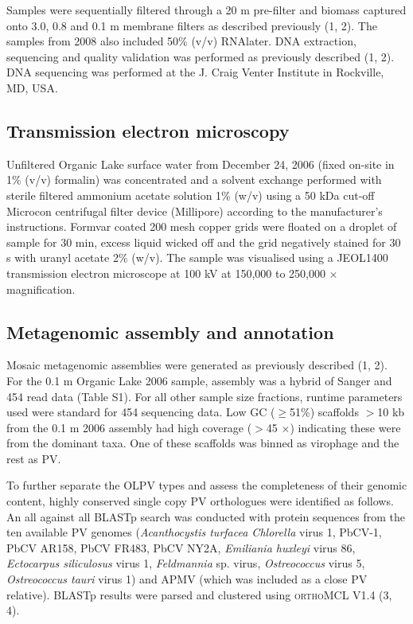 Samples were sequentially filtered through a 20 \textmu{}m pre-filter and biomass captured onto 3.0, 0.8 and 0.1 \textmu{}m membrane filters as described previously (1, 2). 
The samples from 2008 also included 50\% (v/v) \textsc{RNA}later. 
DNA extraction, sequencing and quality validation was performed as previously described (1, 2). 
DNA sequencing was performed at the J. Craig Venter Institute in Rockville, \textsc{MD}, \textsc{USA}.  

\subsection{Transmission electron microscopy}
Unfiltered Organic Lake surface water from December 24, 2006 (fixed on-site in 1\% (v/v) formalin) was concentrated and a solvent exchange performed with sterile filtered ammonium acetate solution 1\% (w/v) using a 50 kDa cut-off Microcon centrifugal filter device (Millipore) according to the manufacturer’s instructions. 
Formvar coated 200 mesh copper grids were floated on a droplet of sample for 30 min, excess liquid wicked off and the grid negatively stained for 30 s with uranyl acetate 2\% (w/v). 
The sample was visualised using a \textsc{JEOL1400} transmission electron microscope at 100 kV at 150,000 to 250,000 $\times$ magnification.

\subsection{Metagenomic assembly and annotation}
Mosaic metagenomic assemblies were generated as previously described (1, 2). 
For the 0.1 \textmu{}m Organic Lake 2006 sample, assembly was a hybrid of Sanger and 454 read data (Table S1). 
For all other sample size fractions, runtime parameters used were standard for 454 sequencing data. 
Low GC ($\ge$51\%) scaffolds $>$10 kb from the 0.1 \textmu{}m 2006 assembly had high coverage ($>$45 $\times$) indicating these were from the dominant taxa. 
One of these scaffolds was binned as virophage and the rest as \ac{PV}. 

To further separate the \ac{OLPV} types and assess the completeness of their genomic content, highly conserved single copy PV orthologues were identified as follows. 
An all against all \ac{BLAST}p search was conducted with protein sequences from the ten available \ac{PV} genomes 
(\emph{Acanthocystis turfacea Chlorella} virus 1, PbCV-1, PbCV AR158, PbCV FR483, PbCV NY2A, \emph{Emiliania huxleyi} virus 86, \emph{Ectocarpus siliculosus} virus 1, \emph{Feldmannia} sp. virus, \emph{Ostreococcus} virus 5, \emph{Ostreococcus tauri} virus 1) and \ac{APMV} (which was included as a close \ac{PV} relative). 
\ac{BLAST}p results were parsed and clustered using \textsc{orthoMCL} V1.4 (3, 4). 

